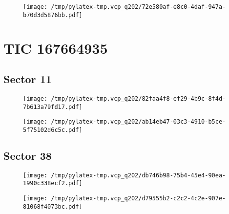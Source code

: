 \documentclass{report}%
\begin{document}
%


\begin{figure}[H]%
\begin{center}%
\centering%
\texttt{[image: /tmp/pylatex-tmp.vcp\_q202/72e580af-e8c0-4daf-947a-b70d3d5876bb.pdf]}%
\end{center}%
\end{figure}

%
\section{TIC 167664935}%
\label{sec:TIC167664935}%
\subsection{Sector 11}%
\label{subsec:16766493511}%


\begin{figure}[H]%
\begin{center}%
\centering%
\texttt{[image: /tmp/pylatex-tmp.vcp\_q202/82faa4f8-ef29-4b9c-8f4d-7b613a79fd17.pdf]}%
\end{center}%
\end{figure}

%


\begin{figure}[H]%
\begin{center}%
\centering%
\texttt{[image: /tmp/pylatex-tmp.vcp\_q202/ab14eb47-03c3-4910-b5ce-5f75102d6c5c.pdf]}%
\end{center}%
\end{figure}

%
\subsection{Sector 38}%
\label{subsec:16766493538}%


\begin{figure}[H]%
\begin{center}%
\centering%
\texttt{[image: /tmp/pylatex-tmp.vcp\_q202/db746b98-75b4-45e4-90ea-1990c338ecf2.pdf]}%
\end{center}%
\end{figure}

%


\begin{figure}[H]%
\begin{center}%
\centering%
\texttt{[image: /tmp/pylatex-tmp.vcp\_q202/d79555b2-c2c2-4c2e-907e-81068f4073bc.pdf]}%
\end{center}%
\end{figure}
\end{document}
